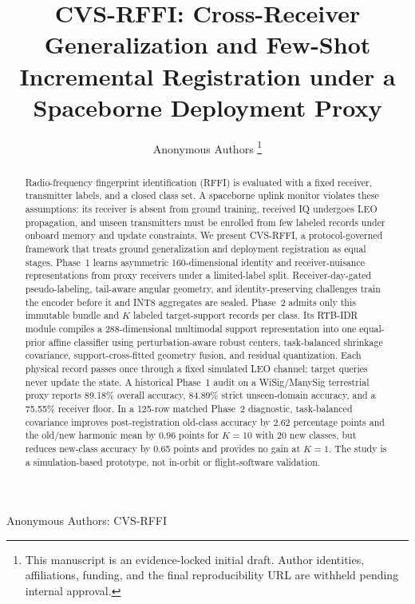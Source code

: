 \documentclass[journal]{IEEEtran}
\newcommand{\method}{CVS-RFFI}
\newcommand{\stagehead}{RTB-IDR}
\begin{document}
\title{\method: Cross-Receiver Generalization and Few-Shot Incremental Registration under a Spaceborne Deployment Proxy}

\author{Anonymous Authors%
\thanks{This manuscript is an evidence-locked initial draft. Author identities, affiliations, funding, and the final reproducibility URL are withheld pending internal approval.}%
}

%
{Anonymous Authors: \method}

\maketitle

\begin{abstract}
Radio-frequency fingerprint identification (RFFI) is evaluated with a fixed receiver, transmitter labels, and a closed class set. A spaceborne uplink monitor violates these assumptions: its receiver is absent from ground training, received IQ undergoes LEO propagation, and unseen transmitters must be enrolled from few labeled records under onboard memory and update constraints. We present \method, a protocol-governed framework that treats ground generalization and deployment registration as equal stages. Phase~1 learns asymmetric 160-dimensional identity and receiver-nuisance representations from proxy receivers under a limited-label split. Receiver-day-gated pseudo-labeling, tail-aware angular geometry, and identity-preserving challenges train the encoder before it and INT8 aggregates are sealed. Phase~2 admits only this immutable bundle and \(K\) labeled target-support records per class. Its \stagehead{} module compiles a 288-dimensional multimodal support representation into one equal-prior affine classifier using perturbation-aware robust centers, task-balanced shrinkage covariance, support-cross-fitted geometry fusion, and residual quantization. Each physical record passes once through a fixed simulated LEO channel; target queries never update the state. A historical Phase~1 audit on a WiSig/ManySig terrestrial proxy reports 89.18\% overall accuracy, 84.89\% strict unseen-domain accuracy, and a 75.55\% receiver floor. In a 125-row matched Phase~2 diagnostic, task-balanced covariance improves post-registration old-class accuracy by 2.62 percentage points and the old/new harmonic mean by 0.96 points for \(K=10\) with 20 new classes, but reduces new-class accuracy by 0.65 points and provides no gain at \(K=1\). The study is a simulation-based prototype, not in-orbit or flight-software validation.
\end{abstract}
\end{document}
